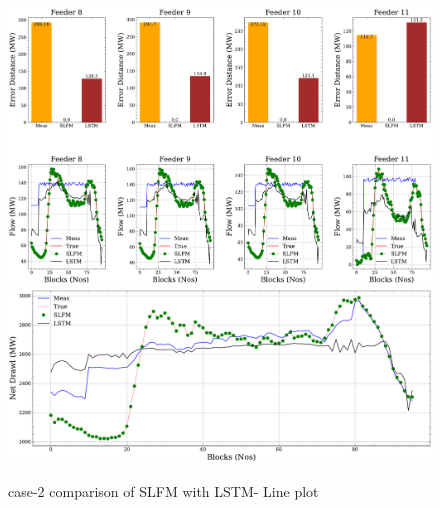 \documentclass[conference]{IEEEtran}
\begin{document}
\begin{figure}[!ht]
\includegraphics[width=1\linewidth]{Test_results12.pdf}
\includegraphics[width=1\linewidth]{Test_results_full2.pdf}
\caption{case-2 comparison of SLFM with LSTM- Line plot}
\label{case2}
\end{figure}
\end{document}
